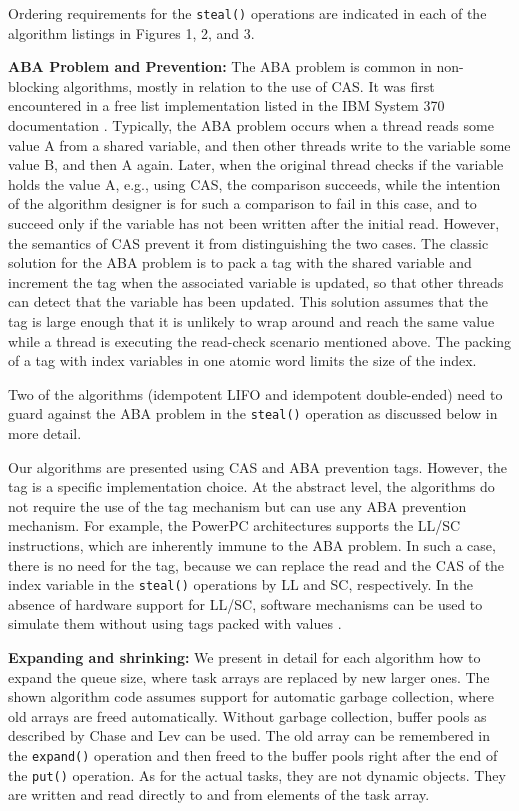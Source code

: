Ordering requirements for the \lstinline!steal()! operations are
indicated in each of the algorithm listings in Figures 1, 2, and 3.

\textbf{ABA Problem and Prevention:} The ABA problem is common in
non-blocking algorithms, mostly in relation to the use of CAS. It was
first encountered in a free list implementation listed in the IBM
System 370 documentation \cite{IBM1974}. Typically, the ABA problem
occurs when a thread reads some value A from a shared variable, and
then other threads write to the variable some value B, and then A
again. Later, when the original thread checks if the variable holds
the value A, e.g., using CAS, the comparison succeeds, while the
intention of the algorithm designer is for such a comparison to fail
in this case, and to succeed only if the variable has not been written
after the initial read. However, the semantics of CAS prevent it from
distinguishing the two cases. The classic solution for the ABA problem
\cite{IBM1974} is to pack a tag with the shared variable and increment
the tag when the associated variable is updated, so that other threads
can detect that the variable has been updated. This solution assumes
that the tag is large enough that it is unlikely to wrap around and
reach the same value while a thread is executing the read-check
scenario mentioned above. The packing of a tag with index variables in
one atomic word limits the size of the index.

Two of the algorithms (idempotent LIFO and idempotent double-ended)
need to guard against the ABA problem in the \lstinline!steal()!
operation as discussed below in more detail.

Our algorithms are presented using CAS and ABA prevention
tags. However, the tag is a specific implementation choice. At the
abstract level, the algorithms do not require the use of the tag
mechanism but can use any ABA prevention mechanism. For example, the
PowerPC architectures supports the LL/SC instructions, which are
inherently immune to the ABA problem. In such a case, there is no need
for the tag, because we can replace the read and the CAS of the index
variable in the \lstinline!steal()! operations by LL and SC,
respectively. In the absence of hardware support for LL/SC, software
mechanisms can be used to simulate them without using tags packed with
values \cite{Moir1997}.

\textbf{Expanding and shrinking:} We present in detail for each
algorithm how to expand the queue size, where task arrays are replaced
by new larger ones. The shown algorithm code assumes support for
automatic garbage collection, where old arrays are freed
automatically. Without garbage collection, buffer pools as described
by Chase and Lev \cite{Chase2005} can be used. The old array can be
remembered in the \lstinline!expand()! operation and then freed to the
buffer pools right after the end of the \lstinline!put()! operation. As
for the actual tasks, they are not dynamic objects. They are written
and read directly to and from elements of the task array.

